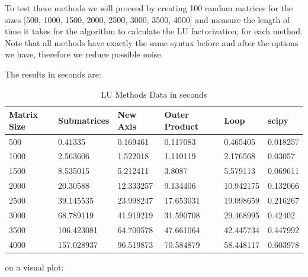 To test these methods we will proceed by creating 100 random matrices for the sizes [500, 1000, 1500, 2000, 2500, 3000, 3500, 4000] and measure the length of time it takes for the algorithm to calculate the LU factorization, for each method. Note that all methods have exactly the same syntax before and after the options we have, therefore we reduce possible noise.

The results in seconds are: 
\begin{table}[H]
    \centering
    \begin{tabular}{|l|l|l|l|l|l|}
    \hline
        \textbf{Matrix Size} & \textbf{Submatrices} & \textbf{New Axis} & \textbf{Outer Product} & \textbf{Loop} & \textbf{scipy} \\ \hline
        500 & 0.41335 & 0.169461 & 0.117083 & 0.465405 & 0.018257 \\ \hline
        1000 & 2.563606 & 1.522018 & 1.110119 & 2.176568 & 0.03057 \\ \hline
        1500 & 8.535015 & 5.212411 & 3.8087 & 5.579113 & 0.069611 \\ \hline
        2000 & 20.30588 & 12.333257 & 9.134406 & 10.942175 & 0.132066 \\ \hline
        2500 & 39.145535 & 23.998247 & 17.653031 & 19.098659 & 0.216267 \\ \hline
        3000 & 68.789119 & 41.919219 & 31.590708 & 29.468995 & 0.42402 \\ \hline
        3500 & 106.423081 & 64.700578 & 47.661064 & 42.445734 & 0.447992 \\ \hline
        4000 & 157.028937 & 96.519873 & 70.584879 & 58.448117 & 0.603978 \\ \hline
    \end{tabular}
    \caption{LU Methods Data in seconds}
\end{table}

on a visual plot:

